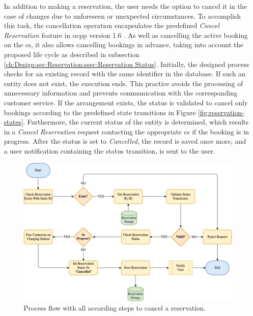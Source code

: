 In addition to making a reservation, the user needs the option to cancel it in the case of changes due to unforeseen or unexpected circumstances.
To accomplish this task, the cancellation operation encapsulates the predefined \textit{Cancel Reservation} feature in \acrshort{ocpp} version 1.6 \cite{noauthor_ocpp_nodate}. As well as cancelling the active booking on the \acrshort{cs}, it also allows cancelling bookings in advance, taking into account the proposed life cycle as described in subsection \ref{ch:Design:sec:Reservation:ssec:Reservation Status}.
Initially, the designed process checks for an existing record with the same identifier in the database. If such an entity does not exist, the execution ends. This practice avoids the processing of unnecessary information and prevents communication with the corresponding customer service.
If the arrangement exists, the status is validated to cancel only bookings according to the predefined state transitions in Figure \ref{fig:reservation-states}. Furthermore, the current status of the entity is determined, which results in a \textit{Cancel Reservation} request contacting the appropriate \acrshort{cs} if the booking is in progress.
After the status is set to \textit{Cancelled}, the record is saved once more, and a user notification containing the status transition, is sent to the user.

\begin{figure}[h]
    \centering
    \includegraphics[scale=0.4]{resources/images/main/5_design/processes/ReservationCancel.png}
    \caption{Process flow with all according steps to cancel a reservation.}
    \label{fig:cancel-reservation-flowchart}
\end{figure}

